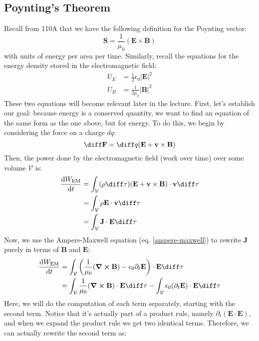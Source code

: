 \subsection{Poynting's Theorem}
Recall from 110A that we have the following definition for the Poynting vector:
\begin{equation}
	\label{poynting}
	\mathbf{S} = \frac{1}{\mu_0}(\mathbf{E} \times \mathbf{B})
\end{equation}
with units of energy per area per time. Similarly, recall the equations for the energy density stored in the
electromagnetic field:
\begin{align*}
	U_E &= \frac{1}{2}\epsilon_0 |\mathbf{E}|^2\\
	U_B &= \frac{1}{2\mu_0}|\mathbf{B}|^2 
\end{align*}
These two equations will become relevant later in the lecture. First, let's establish our goal: because
energy is a conserved quantity, we want to find an equation of the same form as the one above, but for
energy. To do this, we begin by considering the force on a charge \( dq \):
\[
	\diff \mathbf{F} = \diff q (\mathbf{E} + \mathbf{v} \times \mathbf{B})
\]
Then, the power done by the electromagnetic field (work over time) over some volume \( \mathcal{V} \) is:
\begin{align*}
	\dv{W_\text{EM}}{t} &= \int_{\mathcal{V}}(\rho \diff \tau) (\mathbf{E} + \mathbf{v} \times
	\mathbf{B})\cdot \mathbf{v} \diff \tau\\
	&= \int_{\mathcal{V}}\rho \mathbf{E} \cdot \mathbf{v} \diff \tau \\ 
	&= \int_{\mathcal{V}}\mathbf{J} \cdot \mathbf{E} \diff \tau 
\end{align*}
Now, we use the Ampere-Maxwell equation (eq. \ref{ampere-maxwell}) to rewrite \( \mathbf{J} \) purely in
terms of \( \mathbf{B} \) and \( \mathbf{E} \):
\begin{align*}
	\dv{W_\text{EM}}{t} &= \int_{\mathcal{V}}\left( \frac{1}{\mu_0}(\curl \mathbf{B}) - \epsilon_0 \partial_t
	\mathbf{E}\right) \cdot \mathbf{E} \diff \tau \\ 
	&= \int_{\mathcal{V}}\frac{1}{\mu_0}(\curl \mathbf{B}) \cdot \mathbf{E} \diff \tau -
	\int_{\mathcal{V}}\epsilon_0 (\partial_t \mathbf{E}) \cdot \mathbf{E} \diff \tau 
\end{align*}
Here, we will do the computation of each term separately, starting with the second term. Notice that it's
actually part of a product rule, namely \( \partial_t(\mathbf{E} \cdot \mathbf{E}) \), and when we expand the
product rule we get two identical terms. Therefore, we can actually rewrite the second term as:
